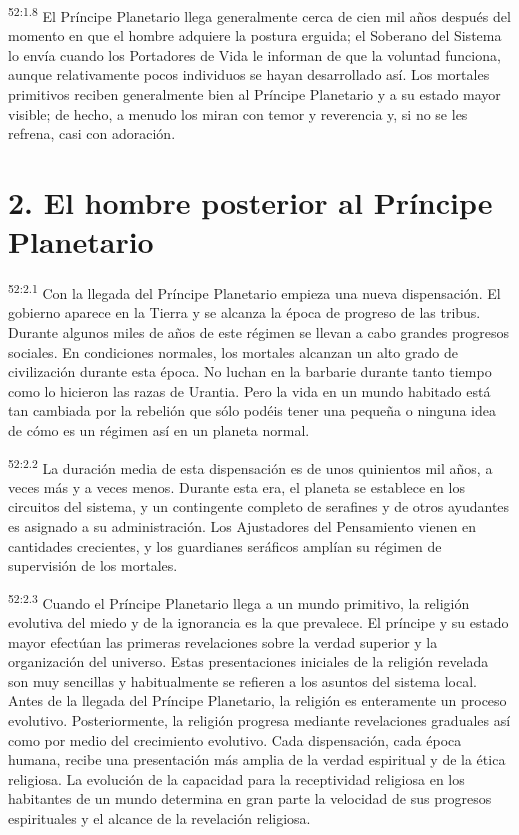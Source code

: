 \par
\textsuperscript{52:1.8} El Príncipe Planetario llega generalmente cerca de cien mil años después del momento en que el hombre adquiere la postura erguida; el Soberano del Sistema lo envía cuando los Portadores de Vida le informan de que la voluntad funciona, aunque relativamente pocos individuos se hayan desarrollado así. Los mortales primitivos reciben generalmente bien al Príncipe Planetario y a su estado mayor visible; de hecho, a menudo los miran con temor y reverencia y, si no se les refrena, casi con adoración.

\section*{2. El hombre posterior al Príncipe Planetario}
\par
\textsuperscript{52:2.1} Con la llegada del Príncipe Planetario empieza una nueva dispensación. El gobierno aparece en la Tierra y se alcanza la época de progreso de las tribus. Durante algunos miles de años de este régimen se llevan a cabo grandes progresos sociales. En condiciones normales, los mortales alcanzan un alto grado de civilización durante esta época. No luchan en la barbarie durante tanto tiempo como lo hicieron las razas de Urantia. Pero la vida en un mundo habitado está tan cambiada por la rebelión que sólo podéis tener una pequeña o ninguna idea de cómo es un régimen así en un planeta normal.

\par
\textsuperscript{52:2.2} La duración media de esta dispensación es de unos quinientos mil años, a veces más y a veces menos. Durante esta era, el planeta se establece en los circuitos del sistema, y un contingente completo de serafines y de otros ayudantes es asignado a su administración. Los Ajustadores del Pensamiento vienen en cantidades crecientes, y los guardianes seráficos amplían su régimen de supervisión de los mortales.

\par
\textsuperscript{52:2.3} Cuando el Príncipe Planetario llega a un mundo primitivo, la religión evolutiva del miedo y de la ignorancia es la que prevalece. El príncipe y su estado mayor efectúan las primeras revelaciones sobre la verdad superior y la organización del universo. Estas presentaciones iniciales de la religión revelada son muy sencillas y habitualmente se refieren a los asuntos del sistema local. Antes de la llegada del Príncipe Planetario, la religión es enteramente un proceso evolutivo. Posteriormente, la religión progresa mediante revelaciones graduales así como por medio del crecimiento evolutivo. Cada dispensación, cada época humana, recibe una presentación más amplia de la verdad espiritual y de la ética religiosa. La evolución de la capacidad para la receptividad religiosa en los habitantes de un mundo determina en gran parte la velocidad de sus progresos espirituales y el alcance de la revelación religiosa.


